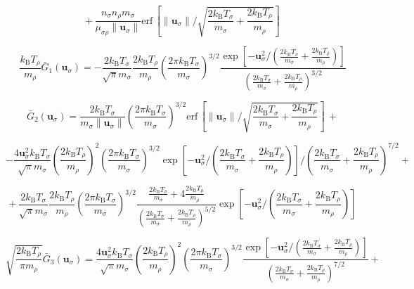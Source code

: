\begin{equation}
    +\,\frac{n_\sigma n_\rho m_\sigma}{\mu_{\sigma\rho}\|\mathbf{u}_\sigma\|}\text{erf}\,\left[\|\mathbf{u}_\sigma\|\bigg/\sqrt{\frac{2k_\mathrm{B}T_\sigma}{m_\sigma}+\frac{2k_\mathrm{B}T_\rho}{m_\rho}}\right]
\end{equation}

\begin{equation}
    \frac{k_\mathrm{B}T_\rho}{m_\rho}\bar{G}_1(\mathbf{u}_\sigma)=-\frac{2k_\mathrm{B}T_\sigma}{\sqrt{\pi}m_\sigma}\frac{2k_\mathrm{B}T_\rho}{m_\rho}\left(\frac{2\pi k_\mathrm{B}T_\sigma}{m_\sigma}\right)^{3/2}\frac{\exp{\left[-\mathbf{u}_\sigma^2\bigg/\left(\frac{2k_\mathrm{B}T_\sigma}{m_\sigma}+\frac{2k_\mathrm{B}T_\rho}{m_\rho}\right)\right]}}{\left(\frac{2k_\mathrm{B}T_\sigma}{m_\sigma}+\frac{2k_\mathrm{B}T_\rho}{m_\rho}\right)^{3/2}}
\end{equation}

\begin{equation*}
    \bar{G}_2(\mathbf{u}_\sigma)=\frac{2k_\mathrm{B}T_\sigma}{m_\sigma\|\mathbf{u}_\sigma\|}\left(\frac{2\pi k_\mathrm{B}T_\sigma}{m_\sigma}\right)^{3/2}\text{erf}\,\left[\|\mathbf{u}_\sigma\|\bigg/\sqrt{\frac{2k_\mathrm{B}T_\sigma}{m_\sigma}+\frac{2k_\mathrm{B}T_\rho}{m_\rho}}\right]\,+
\end{equation*}

\begin{equation*}
    -\frac{4\mathbf{u}_\sigma^2k_\mathrm{B}T_\sigma}{\sqrt{\pi}m_\sigma}\left(\frac{2k_\mathrm{B}T_\rho}{m_\rho}\right)^2\left(\frac{2\pi k_\mathrm{B}T_\sigma}{m_\sigma}\right)^{3/2}\exp{\left[-\mathbf{u}_\sigma^2\bigg/\left(\frac{2k_\mathrm{B}T_\sigma}{m_\sigma}+\frac{2k_\mathrm{B}T_\rho}{m_\rho}\right)\right]}\bigg/\left(\frac{2k_\mathrm{B}T_\sigma}{m_\sigma}+\frac{2k_\mathrm{B}T_\rho}{m_\rho}\right)^{7/2}+
\end{equation*}

\begin{equation}
    +\,\frac{2k_\mathrm{B}T_\sigma}{\sqrt{\pi}m_\sigma}\frac{2k_\mathrm{B}T_\rho}{m_\rho}\left(\frac{2\pi k_\mathrm{B}T_\sigma}{m_\sigma}\right)^{3/2}\frac{\frac{2k_\mathrm{B}T_\sigma}{m_\sigma}+4\frac{2k_\mathrm{B}T_\rho}{m_\rho}}{\left(\frac{2k_\mathrm{B}T_\sigma}{m_\sigma}+\frac{2k_\mathrm{B}T_\rho}{m_\rho}\right)^{5/2}}\exp{\left[-\mathbf{u}_\sigma^2\bigg/\left(\frac{2k_\mathrm{B}T_\sigma}{m_\sigma}+\frac{2k_\mathrm{B}T_\rho}{m_\rho}\right)\right]}
\end{equation}

\begin{equation*}
    \sqrt{\frac{2k_\mathrm{B}T_\rho}{\pi m_\rho}}\bar{G}_3(\mathbf{u}_\sigma)=\frac{4\mathbf{u}_\sigma^2k_\mathrm{B}T_\sigma}{\sqrt{\pi}m_\sigma}\left(\frac{2k_\mathrm{B}T_\rho}{m_\rho}\right)^2\left(\frac{2\pi k_\mathrm{B}T_\sigma}{m_\sigma}\right)^{3/2}\frac{\exp{\left[-\mathbf{u}_\sigma^2\bigg/\left(\frac{2k_\mathrm{B}T_\sigma}{m_\sigma}+\frac{2k_\mathrm{B}T_\rho}{m_\rho}\right)\right]}}{\left(\frac{2k_\mathrm{B}T_\sigma}{m_\sigma}+\frac{2k_\mathrm{B}T_\rho}{m_\rho}\right)^{7/2}}+
\end{equation*}

